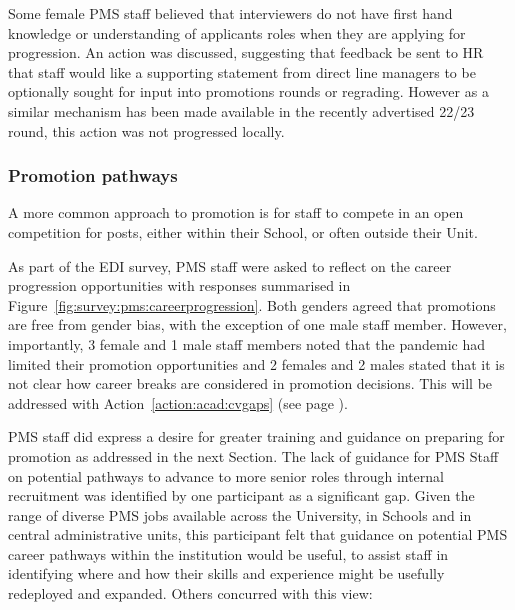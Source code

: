 Some female PMS staff believed that interviewers  do not have first hand knowledge or understanding of applicants roles when they are applying for progression. An action was discussed, suggesting that feedback be sent to HR that staff would like a supporting statement from direct line managers to be optionally sought for input into promotions rounds or regrading. 
However as a similar mechanism has been made available in the recently advertised 22/23 round, this action was not progressed locally. 


\subsubsection{Promotion pathways}
A more common approach to promotion is for staff to compete in an open competition for posts, either within their School, or often outside their Unit. 

As part of the EDI survey, PMS staff were asked to reflect on the career progression opportunities with responses summarised in Figure~\ref{fig:survey:pms:careerprogression}. Both genders agreed that promotions are free from gender bias, with the exception of one male staff member. However, importantly, 3 female and 1 male staff members noted that the pandemic had limited their promotion opportunities and 2 females and 2 males stated that it is not clear how career breaks are considered in promotion decisions. This will be addressed with Action~\ref{action:acad:cvgaps} (see page \pageref{action:acad:cvgaps}). %

PMS staff did express a desire for greater training and guidance on preparing for promotion as addressed in the next Section. The lack of guidance for PMS Staff on potential pathways to advance to more senior roles through internal recruitment was identified by one participant as a significant gap.  Given the range of diverse PMS jobs available across the University, in Schools and in central administrative units, this participant felt that guidance on potential PMS career pathways within the institution would be useful, to assist staff in identifying where and how their skills and experience might be usefully redeployed and expanded. Others concurred with this view:  


